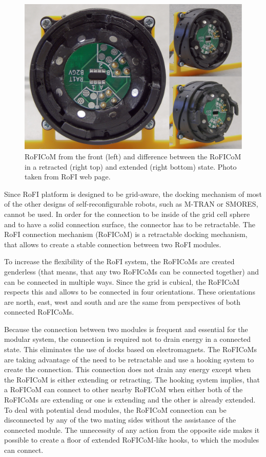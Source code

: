 \documentclass[
  digital, %
  table,   %
  oneside, %
  nolof,     %
  nolot,     %
]{fithesis3}
\begin{document}
\begin{figure}
    \centering
    \includegraphics[width=\linewidth]{data/connector.jpg}
    \caption{RoFICoM from the front (left) and difference between the RoFICoM in a retracted (right top) and extended (right bottom) state. Photo taken from RoFI web page\cite{rofi-web}.}
    \label{fig:connector}
\end{figure}

Since RoFI platform is designed to be grid-aware, the docking mechanism of most of the other designs of self-reconfigurable robots, such as M-TRAN\cite{mtran} or SMORES\cite{smores}, cannot be used.
In order for the connection to be inside of the grid cell sphere and to have a solid connection surface, the connector has to be retractable.
The RoFI connection mechanism (RoFICoM) is a retractable docking mechanism, that allows to create a stable connection between two RoFI modules.

To increase the flexibility of the RoFI system, the RoFICoMs are created genderless (that means, that any two RoFICoMs can be connected together) and can be connected in multiple ways.
Since the grid is cubical, the RoFICoM respects this and allows to be connected in four orientations.
These orientations are north, east, west and south and are the same from perspectives of both connected RoFICoMs.

Because the connection between two modules is frequent and essential for the modular system, the connection is required not to drain energy in a connected state.
This eliminates the use of docks based on electromagnets.
The RoFICoMs are taking advantage of the need to be retractable and use a hooking system to create the connection.
This connection does not drain any energy except when the RoFICoM is either extending or retracting.
The hooking system implies, that a RoFICoM can connect to other nearby RoFICoM when either both of the RoFICoMs are extending or one is extending and the other is already extended.
To deal with potential dead modules, the RoFICoM connection can be disconnected by any of the two mating sides without the assistance of the connected module.
The unnecessity of any action from the opposite side makes it possible to create a floor of extended RoFICoM-like hooks, to which the modules can connect.
\end{document}

